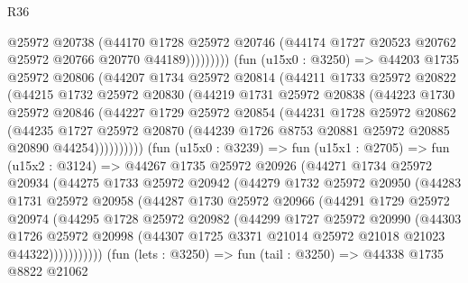 \begin{lexlean}{R36}
\begin{coremodule}
                      @25972
                      @20738
                      (@44170
                        @1728
                        @25972
                        @20746
                        (@44174 @1727 @20523 @20762 @25972 @20766 @20770 @44189)))))))))
        (fun (u15x0 : @3250) =>
        @44203
          @1735
          @25972
          @20806
          (@44207
            @1734
            @25972
            @20814
            (@44211
              @1733
              @25972
              @20822
              (@44215
                @1732
                @25972
                @20830
                (@44219
                  @1731
                  @25972
                  @20838
                  (@44223
                    @1730
                    @25972
                    @20846
                    (@44227
                      @1729
                      @25972
                      @20854
                      (@44231
                        @1728
                        @25972
                        @20862
                        (@44235
                          @1727
                          @25972
                          @20870
                          (@44239 @1726 @8753 @20881 @25972 @20885 @20890 @44254))))))))))
        (fun (u15x0 : @3239) =>
        fun (u15x1 : @2705) =>
        fun (u15x2 : @3124) =>
        @44267
          @1735
          @25972
          @20926
          (@44271
            @1734
            @25972
            @20934
            (@44275
              @1733
              @25972
              @20942
              (@44279
                @1732
                @25972
                @20950
                (@44283
                  @1731
                  @25972
                  @20958
                  (@44287
                    @1730
                    @25972
                    @20966
                    (@44291
                      @1729
                      @25972
                      @20974
                      (@44295
                        @1728
                        @25972
                        @20982
                        (@44299
                          @1727
                          @25972
                          @20990
                          (@44303
                            @1726
                            @25972
                            @20998
                            (@44307 @1725 @3371 @21014 @25972 @21018 @21023 @44322)))))))))))
        (fun (lets : @3250) =>
        fun (tail : @3250) =>
        @44338
          @1735
          @8822
          @21062

\end{coremodule}
\end{lexlean}
